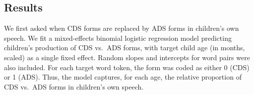 \documentclass[10pt, letterpaper]{article}
\begin{document}
\begin{table}[ht]
\centering
{}
\caption{CHILDES frequency for 15 CDS/ADS word pairs. Child-produced
                             counts include tokens produced only by the target child.} 
\label{tab:tab1}
\end{table}

\hypertarget{results}{%
\subsection{Results}\label{results}}

We first asked when CDS forms are replaced by ADS forms in children's
own speech. We fit a mixed-effects binomial logistic regression model
predicting children's production of CDS vs.~ADS forms, with target child
age (in months, scaled) as a single fixed effect. Random slopes and
intercepts for word pairs were also included. For each target word
token, the form was coded as either 0 (CDS) or 1 (ADS). Thus, the model
captures, for each age, the relative proportion of CDS vs.~ADS forms in
children's own speech.
\end{document}
